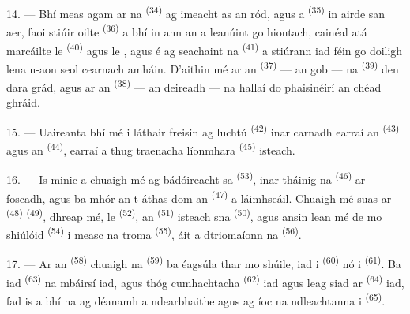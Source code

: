 \VUsaut{3.0mm}
\VUsaut{3.0mm}

14. --- Bhí meas agam ar na  \textsuperscript{(34)} ag
imeacht as an ród, agus a  \textsuperscript{(35)} in airde san aer,
faoi stiúir  oilte \textsuperscript{(36)} a bhí in ann an
 a leanúint go hiontach, cainéal atá marcáilte le 
\textsuperscript{(40)} agus le , agus é ag seachaint na
 \textsuperscript{(41)} a stiúrann iad féin go doiligh lena n-aon
seol cearnach amháin. D'aithin mé ar an 
\textsuperscript{(37)} --- an gob --- na  \textsuperscript{(39)} den
dara grád, agus ar an  \textsuperscript{(38)} --- an deireadh
--- na hallaí do phaisinéirí an chéad ghráid.

15. --- Uaireanta bhí mé i láthair freisin ag luchtú 
\textsuperscript{(42)} inar carnadh earraí an  \textsuperscript{(43)}
agus an  \textsuperscript{(44)}, earraí a thug traenacha
líonmhara  \textsuperscript{(45)} isteach.

\VUsaut{3.0mm}
\VUsaut{3.0mm}

16. --- Is minic a chuaigh mé ag bádóireacht sa 
\textsuperscript{(53)}, inar tháinig na  \textsuperscript{(46)} ar
foscadh, agus ba mhór an t-áthas dom an  \textsuperscript{(47)} a
láimhseáil. Chuaigh mé suas ar  \textsuperscript{(48)}  \textsuperscript{(49)}, dhreap mé, le  \textsuperscript{(52)}, an
 \textsuperscript{(51)} isteach sna 
\textsuperscript{(50)}, agus ansin lean mé de mo shiúlóid 
\textsuperscript{(54)} i measc na  troma \textsuperscript{(55)},
áit a dtriomaíonn na  \textsuperscript{(56)}.

17. --- Ar an  \textsuperscript{(58)} chuaigh na 
\textsuperscript{(59)} ba éagsúla thar mo shúile, iad i 
\textsuperscript{(60)} nó i  \textsuperscript{(61)}. Ba iad
 \textsuperscript{(63)} na mbáirsí iad, agus thóg 
cumhachtacha \textsuperscript{(62)} iad agus leag siad ar 
\textsuperscript{(64)} iad, fad is a bhí na  ag déanamh a
ndearbhaithe agus ag íoc na ndleachtanna i 
\textsuperscript{(65)}.

